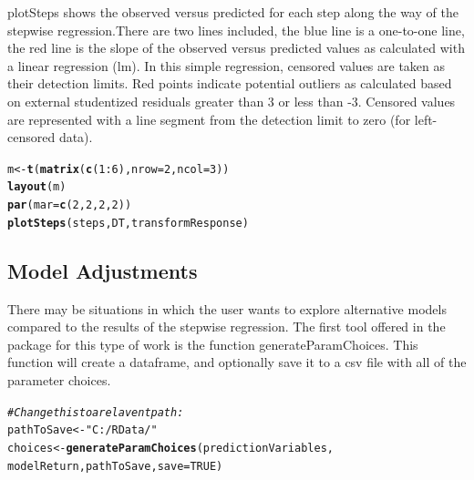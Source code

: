 \documentclass[a4paper,11pt]{article}\usepackage[]{graphicx}\usepackage[]{color}
\makeatletter
\newcommand{\hlstr}[1]{\textcolor[rgb]{0.192,0.494,0.8}{#1}}%
\newcommand{\hlcom}[1]{\textcolor[rgb]{0.678,0.584,0.686}{\textit{#1}}}%
\newcommand{\hlkwd}[1]{\textcolor[rgb]{0.737,0.353,0.396}{\textbf{#1}}}%
\newenvironment{kframe}{%
 \def\at@end@of@kframe{}%
 \ifinner\ifhmode%
  \def\at@end@of@kframe{\end{minipage}}%
  \begin{minipage}{\columnwidth}%
 \fi\fi%
 \def\FrameCommand##1{\hskip\@totalleftmargin \hskip-\fboxsep
 \colorbox{shadecolor}{##1}\hskip-\fboxsep
     \hskip-\linewidth \hskip-\@totalleftmargin \hskip\columnwidth}%
 \MakeFramed {\advance\hsize-\width
   \@totalleftmargin\z@ \linewidth\hsize
   \@setminipage}}%
 {\par\unskip\endMakeFramed%
 \at@end@of@kframe}
\newenvironment{knitrout}{}{} %
\makeatother
\begin{document}
\FloatBarrier

plotSteps shows the observed versus predicted for each step along the way of the stepwise regression.There are two lines included, the blue line is a one-to-one line, the red line is the slope of the observed versus predicted values as calculated with a linear regression (lm). In this simple regression, censored values are taken as their detection limits. Red points indicate potential outliers as calculated based on external studentized residuals greater than 3 or less than -3. Censored values are represented with a line segment from the detection limit to zero (for left-censored data).


\begin{knitrout}
\color{fgcolor}\begin{kframe}
\begin{alltt}

m <- \hlkwd{t}(\hlkwd{matrix}(\hlkwd{c}(1:6), nrow = 2, ncol = 3))
\hlkwd{layout}(m)
\hlkwd{par}(mar=\hlkwd{c}(2,2,2,2))
\hlkwd{plotSteps}(steps,DT,transformResponse)
\end{alltt}


{\ttfamily\noindent\bfseries\color{errorcolor}{Error: object 'steps' not found}}\end{kframe}
\end{knitrout}


\FloatBarrier

\subsection{Model Adjustments}
There may be situations in which the user wants to explore alternative models compared to the results of the stepwise regression. The first tool offered in the package for this type of work is the function generateParamChoices. This function will create a dataframe, and optionally save it to a csv file with all of the parameter choices.

\begin{knitrout}
\color{fgcolor}\begin{kframe}
\begin{alltt}
\hlcom{#Change this to a relavent path:}
pathToSave <- \hlstr{"C:/RData/"}
choices <- \hlkwd{generateParamChoices}(predictionVariables,
                                modelReturn,pathToSave,save=TRUE)

\end{alltt}
\end{kframe}
\end{knitrout}
\end{document}
